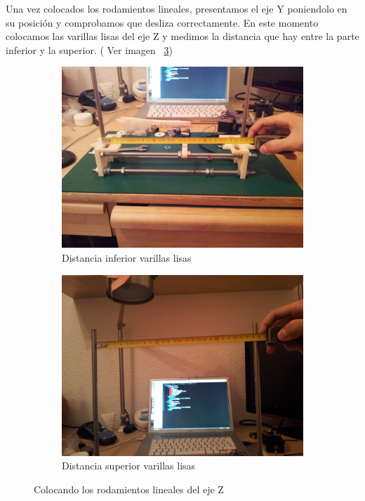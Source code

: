 		Una vez colocados los rodamientos lineales, presentamos el eje Y poniendolo en su posición y comprobamos que desliza correctamente. En este momento colocamos las varillas lisas del eje Z y medimos la distancia que hay entre la parte inferior y la superior. ( Ver imagen ~\ref{fig:10.z})
		\begin{figure}[H]
		        \centering
		        \begin{subfigure}[htb]{0.5\textwidth}
		                \centering
		                \includegraphics[width=\textwidth]{../../Fotos/74.jpg}
		                \caption{Distancia inferior varillas lisas}
		                \label{fig:8.z}
		        \end{subfigure}
		        \begin{subfigure}[htb]{0.5\textwidth}
		                \centering
		                \includegraphics[width=\textwidth]{../../Fotos/75.jpg}
		                \caption{Distancia superior varillas lisas}
		                \label{fig:9.z}
		        \end{subfigure}
		        \caption{Colocando los rodamientos lineales del eje Z}\label{fig:10.z}
		\end{figure}
